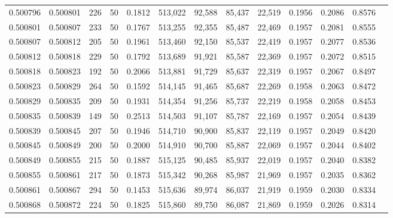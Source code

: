 \begin{tabular}{rrrrrrrrrrrrr}
0.500796 & 0.500801 & 226 &  50 &                                     0.1812 & 513,022 &  92,588 &  85,437 &  22,519 & 0.1956 & 0.2086 & 0.8576 \\
0.500801 & 0.500807 & 233 &  50 &                                     0.1767 & 513,255 &  92,355 &  85,487 &  22,469 & 0.1957 & 0.2081 & 0.8555 \\
0.500807 & 0.500812 & 205 &  50 &                                     0.1961 & 513,460 &  92,150 &  85,537 &  22,419 & 0.1957 & 0.2077 & 0.8536 \\
0.500812 & 0.500818 & 229 &  50 &                                     0.1792 & 513,689 &  91,921 &  85,587 &  22,369 & 0.1957 & 0.2072 & 0.8515 \\
0.500818 & 0.500823 & 192 &  50 &                                     0.2066 & 513,881 &  91,729 &  85,637 &  22,319 & 0.1957 & 0.2067 & 0.8497 \\
0.500823 & 0.500829 & 264 &  50 &                                     0.1592 & 514,145 &  91,465 &  85,687 &  22,269 & 0.1958 & 0.2063 & 0.8472 \\
0.500829 & 0.500835 & 209 &  50 &                                     0.1931 & 514,354 &  91,256 &  85,737 &  22,219 & 0.1958 & 0.2058 & 0.8453 \\
0.500835 & 0.500839 & 149 &  50 &                                     0.2513 & 514,503 &  91,107 &  85,787 &  22,169 & 0.1957 & 0.2054 & 0.8439 \\
0.500839 & 0.500845 & 207 &  50 &                                     0.1946 & 514,710 &  90,900 &  85,837 &  22,119 & 0.1957 & 0.2049 & 0.8420 \\
0.500845 & 0.500849 & 200 &  50 &                                     0.2000 & 514,910 &  90,700 &  85,887 &  22,069 & 0.1957 & 0.2044 & 0.8402 \\
0.500849 & 0.500855 & 215 &  50 &                                     0.1887 & 515,125 &  90,485 &  85,937 &  22,019 & 0.1957 & 0.2040 & 0.8382 \\
0.500855 & 0.500861 & 217 &  50 &                                     0.1873 & 515,342 &  90,268 &  85,987 &  21,969 & 0.1957 & 0.2035 & 0.8362 \\
0.500861 & 0.500867 & 294 &  50 &                                     0.1453 & 515,636 &  89,974 &  86,037 &  21,919 & 0.1959 & 0.2030 & 0.8334 \\
0.500868 & 0.500872 & 224 &  50 &                                     0.1825 & 515,860 &  89,750 &  86,087 &  21,869 & 0.1959 & 0.2026 & 0.8314 \\

\end{tabular}
